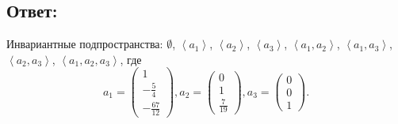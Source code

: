 \documentclass[12pt]{article}
\begin{document}
    \subsection*{Ответ:}
    {
        \color{blue}
        Инвариантные подпространства:
        $\emptyset$,
        $\left < a_1 \right >$, $\left < a_2 \right >$, $\left < a_3 \right >$,
        $\left < a_1, a_2 \right >$, $\left < a_1, a_3 \right >$, $\left < a_2, a_3 \right >$,
        $\left < a_1, a_2, a_3 \right >$,
        где
        \[
            a_1 = \begin{pmatrix}
                      1 \\ - \frac{5}{4} \\ - \frac{67}{12}
            \end{pmatrix} ,
            a_2 = \begin{pmatrix}
                      0 \\ 1 \\ \frac{7}{19}
            \end{pmatrix} ,
            a_3 = \begin{pmatrix}
                      0 \\ 0 \\ 1
            \end{pmatrix} .
        \]
    }
\end{document}
